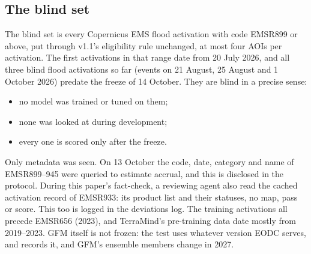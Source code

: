 \documentclass[10pt,twocolumn,a4paper]{article}
\begin{document}
\subsection{The blind set}
The blind set is every Copernicus EMS flood activation with code EMSR899 or above, put through v1.1's eligibility rule
unchanged, at most four AOIs per activation. The first activations in that range date from 20 July 2026, and all three
blind flood activations so far (events on 21 August, 25 August and 1 October 2026) predate the freeze of 14 October.
They are blind in a precise sense:
\begin{itemize}
  \item no model was trained or tuned on them;
  \item none was looked at during development;
  \item every one is scored only after the freeze.
\end{itemize}
Only metadata was seen. On 13 October the code, date, category and name of EMSR899--945 were queried to estimate
accrual, and this is disclosed in the protocol. During this paper's fact-check, a reviewing agent also read the cached
activation record of EMSR933: its product list and their statuses, no map, pass or score. This too is logged in the
deviations log. The training activations all precede EMSR656 (2023), and TerraMind's pre-training data date mostly
from 2019--2023. GFM itself is not frozen: the test uses whatever version EODC serves, and records it, and GFM's
ensemble members change in 2027.
\end{document}
